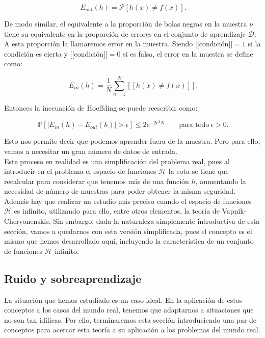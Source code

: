 \[
\ E_{out}(h)= \mathcal{P}\left[ h(x) \neq f(x)\right].
\]

De modo similar, el equivalente a la proporción de bolas negras en la muestra $\nu$ tiene su equivalente en la proporción de errores en el conjunto de aprendizaje $\mathcal{D}$. A esta proporción la llamaremos error en la muestra. Siendo $[\![$condición$]\!]=1$ si la condición es cierta y $[\![$condición$]\!]=0$ si es falsa, el error en la muestra se define como:

\[
\ E_{in}(h) = \frac{1}{N} \sum_{n=1}^N [\![h(x) \neq f(x)]\!].
\]

Entonces la inecuación de Hoeffding se puede reescribir como:

\[
\ \mathbb{P}\left[ \mid E_{in}(h) - E_{out}(h) \mid > \epsilon \right] \leq 2e^{-2\epsilon^2 N} \qquad \textrm{para todo} \  \epsilon > 0.
\]

Esto nos permite decir que podemos aprender fuera de la muestra. Pero para ello, vamos a necesitar un gran número de datos de entrada.\\

Este proceso en realidad es una simplificación del problema real, pues al introducir en el problema el espacio de funciones $\mathcal{H}$ la cota se tiene que recalcular para considerar que tenemos más de una función $h$, aumentando la necesidad de número de muestras para poder obtener la misma seguridad. Además hay que realizar un estudio más preciso cuando el espacio de funciones $\mathcal{H}$ es infinito, utilizando para ello, entre otros elementos, la teoría de Vapnik-Chervonenskis. Sin embargo, dada la naturaleza simplemente introductiva de esta sección, vamos a quedarnos con esta versión simplificada, pues el concepto es el mismo que hemos desarrollado aquí, incluyendo la característica de un conjunto de funciones $\mathcal{H}$ infinito.\\

\subsection{Ruido y sobreaprendizaje}


La situación que hemos estudiado es un caso ideal. En la aplicación de estos conceptos a los casos del mundo real, tenemos que adaptarnos a situaciones que no son tan idílicas. Por ello, terminaremos esta sección introduciendo una par de conceptos para acercar esta teoría a su aplicación a los problemas del mundo real.\\

